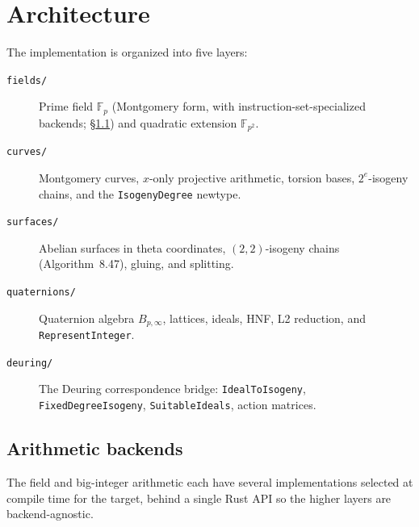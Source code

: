 \section{Architecture}
\label{sec:architecture}

The implementation is organized into five layers:

\begin{description}
  \item[\texttt{fields/}] Prime field $\mathbb{F}_p$ (Montgomery form,
    with instruction-set-specialized backends;
    \S\ref{sec:backends}) and quadratic extension $\mathbb{F}_{p^2}$.
  \item[\texttt{curves/}] Montgomery curves, $x$-only projective
    arithmetic, torsion bases, $2^e$-isogeny chains, and the
    \texttt{IsogenyDegree} newtype.
  \item[\texttt{surfaces/}] Abelian surfaces in theta coordinates,
    $(2,2)$-isogeny chains (Algorithm~8.47), gluing, and splitting.
  \item[\texttt{quaternions/}] Quaternion algebra $B_{p,\infty}$,
    lattices, ideals, HNF, L2 reduction, and \texttt{RepresentInteger}.
  \item[\texttt{deuring/}] The Deuring correspondence bridge:
    \texttt{IdealToIsogeny}, \texttt{FixedDegreeIsogeny},
    \texttt{SuitableIdeals}, action matrices.
\end{description}

\subsection{Arithmetic backends}
\label{sec:backends}

The field and big-integer arithmetic each have several implementations
selected at compile time for the target, behind a single Rust API so
the higher layers are backend-agnostic.

